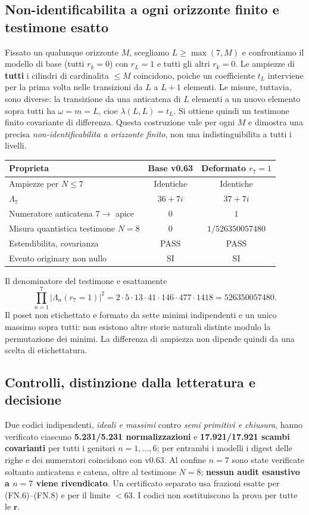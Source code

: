 \documentclass[11pt,a4paper]{article}
\begin{document}
\clearpage
\subsection*{Non-identificabilita a ogni orizzonte finito e testimone esatto}
Fissato un qualunque orizzonte $M$, scegliamo $L\ge\max(7,M)$ e confrontiamo il modello di base (tutti $r_k=0$) con $r_L=1$ e tutti gli altri $r_k=0$. Le ampiezze di \textbf{tutti} i cilindri di cardinalita $\le M$ coincidono, poiche un coefficiente $t_L$ interviene per la prima volta nelle transizioni da $L$ a $L+1$ elementi. Le misure, tuttavia, sono diverse: la transizione da una anticatena di $L$ elementi a un nuovo elemento sopra tutti ha $\omega=m=L$, cioe $\lambda(L,L)=t_L$. Si ottiene quindi un testimone finito covariante di differenza. Questa costruzione vale per ogni $M$ e dimostra una precisa \emph{non-identificabilita a orizzonte finito}, non una indistinguibilita a tutti i livelli.

\begin{center}
\small
\begin{tabular}{p{6cm}cc}
\toprule
Proprieta & Base v0.63 & Deformato $r_7=1$\\
\midrule
Ampiezze per $N\le7$ & Identiche & Identiche\\
$\Lambda_7$ & $36+7i$ & $37+7i$\\
Numeratore anticatena $7\to$ apice & $0$ & $1$\\
Misura quantistica testimone $N=8$ & $0$ & $1/526350057480$\\
Estendibilita, covarianza & PASS & PASS\\
Evento originary non nullo & SI & SI\\
\bottomrule
\end{tabular}
\end{center}
Il denominatore del testimone e esattamente
\begin{equation}
\boxed{\prod_{n=1}^{7}|\Lambda_n(r_7=1)|^2
=2\cdot5\cdot13\cdot41\cdot146\cdot477\cdot1418
=526350057480.}\tag{FN.8}
\end{equation}
Il poset non etichettato e formato da sette minimi indipendenti e un unico massimo sopra tutti: non esistono altre storie naturali distinte modulo la permutazione dei minimi. La differenza di ampiezza non dipende quindi da una scelta di etichettatura.

\subsection*{Controlli, distinzione dalla letteratura e decisione}
Due codici indipendenti, \emph{ideali e massimi} contro \emph{semi primitivi e chiusura}, hanno verificato ciascuno \textbf{5.231/5.231 normalizzazioni} e \textbf{17.921/17.921 scambi covarianti} per tutti i genitori $n=1,\ldots,6$; per entrambi i modelli i digest delle righe e dei numeratori coincidono con v0.63. Al confine $n=7$ sono state verificate soltanto anticatena e catena, oltre al testimone $N=8$; \textbf{nessun audit esaustivo a $n=7$ viene rivendicato}. Un certificato separato usa frazioni esatte per (FN.6)--(FN.8) e per il limite $<63$. I codici non sostituiscono la prova per tutte le $\boldsymbol r$.
\end{document}
